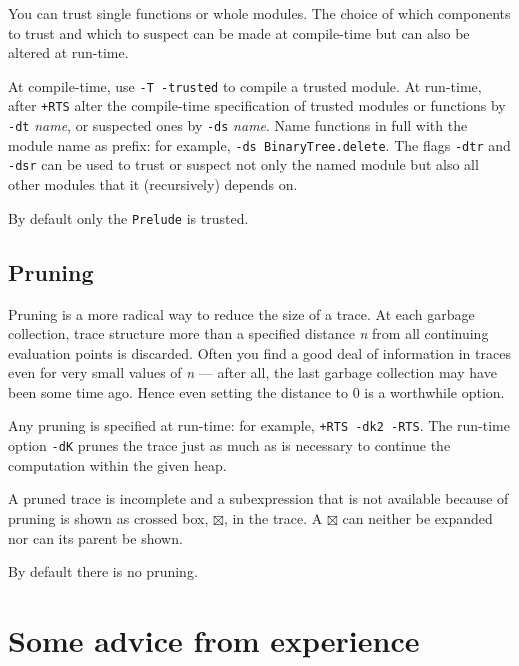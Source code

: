 \documentclass[12pt]{article}
\newcommand{\crossBox}{\boxtimes}
\begin{document}
You can trust single functions or whole modules.
The choice of which components to trust and which to suspect can be made at
compile-time but can also be altered at run-time.
   
At compile-time, use \texttt{-T -trusted} to compile a trusted module. 
At run-time, after \texttt{+RTS} alter the compile-time specification
of trusted modules or functions by \texttt{-dt} \emph{name}, or suspected
ones by \texttt{-ds} \emph{name}.  Name functions in full with the
module name as prefix: for example, \texttt{-ds BinaryTree.delete}.
The flags \texttt{-dtr} and \texttt{-dsr} can be used to trust or suspect not only the
named module but also all other modules that it (recursively) depends on.
 
By default only the \texttt{Prelude} is trusted.


\subsection{Pruning}

Pruning is a more radical way to reduce the size of a trace.
At each garbage collection, trace structure more
than a specified distance \emph{n} from all continuing evaluation points
is discarded. Often you find a good deal of information in traces even for very small values of \emph{n} --- after all, the last garbage collection may have been some time ago. Hence even setting the distance to 0 is a worthwhile option.
 
Any pruning is specified at run-time: for example,
\texttt{+RTS -dk2 -RTS}.
The run-time option \texttt{-dK} prunes the trace just as much as is necessary to continue the computation within the given heap.

A pruned trace is incomplete and a subexpression that is not available because of pruning is shown as crossed box, $\crossBox$, in the trace.
A $\crossBox$ can neither be expanded nor can its parent be shown.
   
By default there is no pruning.




\section{Some advice from experience}
\end{document}
